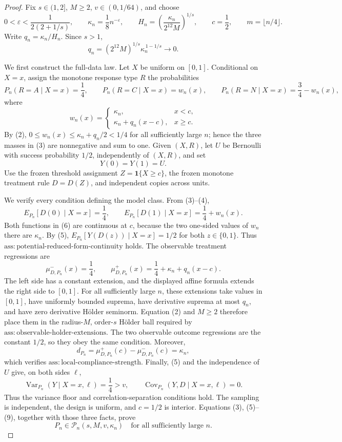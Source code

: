 \documentclass{article}
\begin{document}
\begin{proof}
Fix \(s\in(1,2]\), \(M\ge2\), \(v\in(0,1/64)\), and choose
\[
 0<\varepsilon<\frac{1}{2(2+1/s)},
 \qquad
 \kappa_n=\frac18 n^{-\varepsilon},
 \qquad
 H_n=\left(\frac{\kappa_n}{2^{12}M}\right)^{1/s},
 \qquad c=\frac12,
 \qquad m=\lfloor n/4\rfloor.
 \tag{1}
\]
Write \(q_n=\kappa_n/H_n\).  Since \(s>1\),
\[
 q_n=(2^{12}M)^{1/s}\kappa_n^{\,1-1/s}\longrightarrow0.
 \tag{2}
\]

We first construct the full-data law.  Let \(X\) be uniform on
\([0,1]\).  Conditional on \(X=x\), assign the monotone response type
\(R\) the probabilities
\[
 P_n(R=A\mid X=x)=\frac14,
 \qquad
 P_n(R=C\mid X=x)=w_n(x),
 \qquad
 P_n(R=N\mid X=x)=\frac34-w_n(x),
 \tag{3}
\]
where
\[
 w_n(x)=
 \begin{cases}
  \kappa_n,&x<c,\\
  \kappa_n+q_n(x-c),&x\ge c.
 \end{cases}
 \tag{4}
\]
By (2), \(0\le w_n(x)\le\kappa_n+q_n/2<1/4\) for all sufficiently
large \(n\); hence the three masses in (3) are nonnegative and sum to
one.  Given \((X,R)\), let \(U\) be Bernoulli with success probability
\(1/2\), independently of \((X,R)\), and set
\[
 Y(0)=Y(1)=U.
 \tag{5}
\]
Use the frozen threshold assignment \(Z=\mathbf 1\{X\ge c\}\), the
frozen monotone treatment rule \(D=D(Z)\), and independent copies
across units.

We verify every condition defining the model class.  From (3)--(4),
\[
 E_{P_n}[D(0)\mid X=x]=\frac14,
 \qquad
 E_{P_n}[D(1)\mid X=x]=\frac14+w_n(x).
 \tag{6}
\]
Both functions in (6) are continuous at \(c\), because the two
one-sided values of \(w_n\) there are \(\kappa_n\).  By (5),
\(E_{P_n}[Y(D(z))\mid X=x]=1/2\) for both \(z\in\{0,1\}\).  Thus
\(\mathrm{ass:potential\mbox{-}reduced\mbox{-}form\mbox{-}continuity}\)
holds.  The observable treatment regressions are
\[
 \mu_{D,P_n}^{-}(x)=\frac14,
 \qquad
 \mu_{D,P_n}^{+}(x)=\frac14+\kappa_n+q_n(x-c).
 \tag{7}
\]
The left side has a constant extension, and the displayed affine
formula extends the right side to \([0,1]\).  For all sufficiently
large \(n\), these extensions take values in \([0,1]\), have uniformly
bounded suprema, have derivative suprema at most \(q_n\), and have
zero derivative H\"older seminorm.  Equation (2) and \(M\ge2\)
therefore place them in the radius-\(M\), order-\(s\) H\"older ball
required by
\(\mathrm{ass:observable\mbox{-}holder\mbox{-}extensions}\).  The two
observable outcome regressions are the constant \(1/2\), so they obey
the same condition.  Moreover,
\[
 d_{P_n}=\mu_{D,P_n}^{+}(c)-\mu_{D,P_n}^{-}(c)=\kappa_n,
 \tag{8}
\]
which verifies \(\mathrm{ass:local\mbox{-}compliance\mbox{-}strength}\).
Finally, (5) and the independence of \(U\) give, on both sides
\(\ell\),
\[
 \operatorname{Var}_{P_n}(Y\mid X=x,\ell)=\frac14>v,
 \qquad
 \operatorname{Cov}_{P_n}(Y,D\mid X=x,\ell)=0.
 \tag{9}
\]
Thus the variance floor and correlation-separation conditions hold.
The sampling is independent, the design is uniform, and \(c=1/2\) is
interior.  Equations (3), (5)--(9), together with those three facts,
prove
\[
 P_n\in\mathcal P_n(s,M,v,\kappa_n)
 \quad\text{for all sufficiently large }n.
 \tag{10}
\]


\end{proof}
\end{document}

